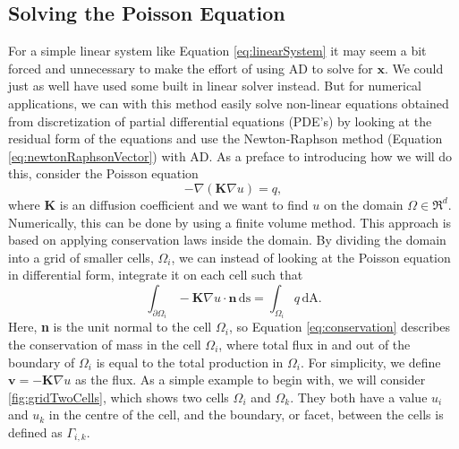 \subsection{Solving the Poisson Equation}
For a simple linear system like Equation \eqref{eq:linearSystem} it may seem a bit forced and unnecessary to make the effort of using AD to solve for $\boldsymbol{x}$. We could just as well have used some built in linear solver instead. But for numerical applications, we can with this method easily solve non-linear equations obtained from discretization of partial differential equations (PDE's) by looking at the residual form of the equations and use the Newton-Raphson method (Equation \eqref{eq:newtonRaphsonVector}) with AD.  As a preface to introducing how we will do this, consider the Poisson equation
\begin{equation}
    -\nabla(\textbf{K}\nabla u) = q,
    \label{eq:Poisson}
\end{equation}
where \textbf{K} is an diffusion coefficient and we want to find $u$ on the domain $\Omega \in \Re^d$. Numerically, this can be done by using a finite volume method. This approach is based on applying conservation laws inside the domain. By dividing the domain into a grid of smaller cells, $\Omega_i$, we can instead of looking at the Poisson equation in differential form, integrate it on each cell such that
\begin{equation}
    \int_{\partial\Omega_i} - \textbf{K} \nabla u \cdot \textbf{n}\, \mbox{ds} = \int_{\Omega_i} q \,\mbox{dA}.
    \label{eq:conservation}
\end{equation}
Here, \textbf{n} is the unit normal to the cell $\Omega_i$, so Equation \eqref{eq:conservation} describes the conservation of mass in the cell $\Omega_i$, where total flux in and out of the boundary of $\Omega_i$ is equal to the total production in $\Omega_i$. For simplicity, we define $\textbf{v} = - \textbf{K} \nabla u$ as the flux. As a simple example to begin with, we will consider \autoref{fig:gridTwoCells}, which shows two cells $\Omega_i$ and $\Omega_k$. They both have a value $u_i$ and $u_k$ in the centre of the cell, and the boundary, or facet, between the cells is defined as $\Gamma_{i,k}$.

